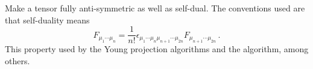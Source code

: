 
Make a tensor fully anti-symmetric as well as self-dual. The
conventions used are that self-duality means
\begin{equation}
F_{\mu_1\cdots \mu_n}
= \frac{1}{n!} \epsilon_{\mu_1\cdots\mu_n \mu_{n+1}\cdots \mu_{2n}} F_{\mu_{n+1}\cdots\mu_{2n}}\,.
\end{equation}
This property used by the Young projection algorithms and
the  algorithm, among others.

